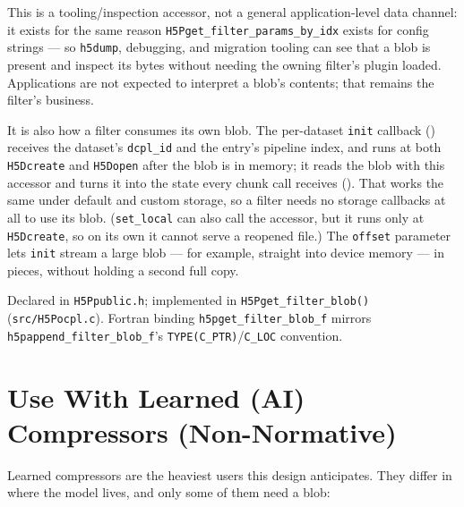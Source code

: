 \documentclass[../RFC-HDFG-2026-003.tex]{subfiles}
\begin{document}
This is a tooling/inspection accessor, not a general application-level
data channel: it exists for the same reason
\texttt{H5Pget\_filter\_params\_by\_idx} exists for config strings ---
so \texttt{h5dump}, debugging, and migration tooling can see that a
blob is present and inspect its bytes without needing the owning
filter's plugin loaded. Applications are not expected to interpret a
blob's contents; that remains the filter's business.

It is also how a filter consumes its own blob.  The per-dataset
\texttt{init} callback () receives the dataset's
\texttt{dcpl\_id} and the entry's pipeline index, and runs at both
\texttt{H5Dcreate} and \texttt{H5Dopen} after the blob is in memory; it
reads the blob with this accessor and turns it into the state every
chunk call receives ().  That works the
same under default and custom storage, so a filter needs no storage
callbacks at all to use its blob.  (\texttt{set\_local} can also call
the accessor, but it runs only at \texttt{H5Dcreate}, so on its own it
cannot serve a reopened file.)  The \texttt{offset} parameter lets
\texttt{init} stream a large blob --- for example, straight into device
memory --- in pieces, without holding a second full copy.

Declared in \texttt{H5Ppublic.h}; implemented in
\texttt{H5Pget\_filter\_blob()} (\texttt{src/H5Pocpl.c}). Fortran
binding \texttt{h5pget\_filter\_blob\_f} mirrors
\texttt{h5pappend\_filter\_blob\_f}'s \texttt{TYPE(C\_PTR)}/\texttt{C\_LOC}
convention.


\section{Use With Learned (AI) Compressors (Non-Normative)}
\label{sec:blob-learned}

Learned compressors are the heaviest users this design anticipates.
They differ in where the model lives, and only some of them need a blob:
\end{document}

